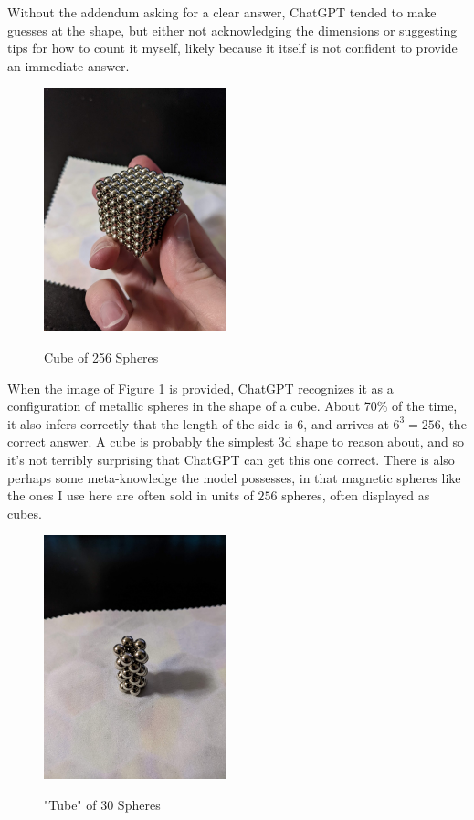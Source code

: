 \documentclass{article}
\begin{document}
	Without the addendum asking for a clear answer, ChatGPT tended to make guesses at the shape, but either not acknowledging the dimensions or suggesting tips for how to count it myself, likely because it itself is not confident to provide an immediate answer.
	
	\begin{figure}[h!]
		\centering
		\includegraphics[width=150pt]{image1.jpg}
		\label{fig:image1}
		\caption{Cube of 256 Spheres}
	\end{figure}
	
	
	When the image of Figure 1 is provided, ChatGPT recognizes it as a configuration of metallic spheres in the shape of a cube. About 70\% of the time, it also infers correctly that the length of the side is 6, and arrives at $6^3=256$, the correct answer. A cube is probably the simplest 3d shape to reason about, and so it's not terribly surprising that ChatGPT can get this one correct. There is also perhaps some meta-knowledge the model possesses, in that magnetic spheres like the ones I use here are often sold in units of $256$ spheres, often displayed as cubes.
	\\
	
	\begin{figure}[h!]
		\centering
		\includegraphics[width=150pt]{image2.jpg}
		\label{fig:image2}
		\caption{"Tube" of 30 Spheres}
	\end{figure}
	
\end{document}
